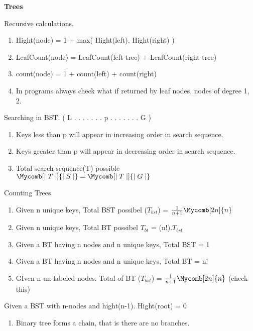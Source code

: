 \centerline{\textbf{ \LARGE Trees}}
\begin{enumerate}
    \item Recursive calculations.
    \begin{enumerate}
        \item Hight(node) = 1  +  max(\; Hight(left), \; Hight(right) \;)
        \item LeafCount(node) = LeafCount(left tree) + LeafCount(right tree)
        \item count(node) = 1 + count(left) + count(right)
        \item  In programs always check what if returned by leaf nodes, nodes of degree 1, 2.
    \end{enumerate}
    \item Searching in BST. ( L . . . . . . . p . . . . . . . G )
    \begin{enumerate}
        \item Keys less than p will appear in increasing order in search sequence.
        \item Keys greater than p will appear in decreasing order in search sequence.
        \item Total search sequence(T) possible \( \Mycomb[\mid T \mid]{\mid S \mid} = \Mycomb[\mid T \mid]{\mid G \mid} \)
    \end{enumerate}
    \item Counting Trees
    \begin{enumerate}
        \item Given n unique keys, Total BST possibel { \Large (\(T_{bst}\)) =  \( \frac{1}{n+1} \Mycomb[2n]{n} \) }
        \item Given n unique keys, Total BT possibel  { \Large \(T_{bt}\) = (n!).\(T_{bst}\) }
        \item Given a BT having n nodes and n unique keys, Total BST = 1
        \item Given a BT having n nodes and n unique keys, Total BT \; = n!
        \item GIven n un labeled nodes. Total of BT{ \Large (\(T_{bst}\)) =  \( \frac{1}{n+1} \Mycomb[2n]{n} \) } (check this)
    \end{enumerate}
    \begin{minipage}{\linewidth}
    \item Given a BST with n-nodes and hight(n-1). Hight(root) = 0
    \begin{enumerate}
        \item  Binary tree forms a chain, that is there are no branches.

\end{enumerate}
\end{minipage}
\end{enumerate}
